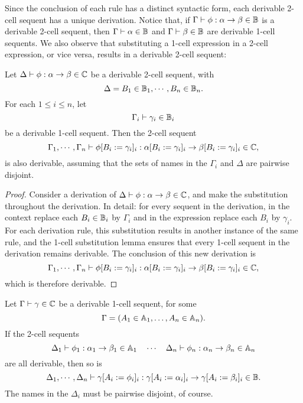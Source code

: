 \documentclass{robinthesisdraft}
\begin{document}
Since the conclusion of each rule has a distinct syntactic form, each derivable
2-cell sequent has a unique derivation.
Notice that, if $\Gamma\vdash \phi:\alpha\to\beta\in\mathbb{B}$ is a derivable
2-cell sequent, then $\Gamma\vdash\alpha\in\mathbb{B}$ and $\Gamma\vdash\beta\in\mathbb{B}$
are derivable 1-cell sequents.
%
We also observe that substituting a 1-cell expression in a 2-cell expression,
or vice versa, results in a derivable 2-cell sequent:
\begin{lemma}[1-in-2 substitution]\label{lemma-1in2}
	Let \( \Delta \vdash \phi:\alpha\to\beta \in\mathbb{C} \)
	be a derivable 2-cell sequent, with
	\[
		\Delta = B_{1}\in\mathbb{B}_{1}, \cdots, B_{n}\in\mathbb{B}_{n}.
	\]
	For each $1\leq i\leq n$, let
	\[
		\Gamma_{i} \vdash \gamma_{i}\in\mathbb{B}_{i}
	\]
	be a derivable 1-cell sequent. Then the 2-cell sequent
	\[ \Gamma_{1}, \cdots, \Gamma_{n}
		\vdash \phi[B_{i}:=\gamma_{i}]_{i}
		: \alpha[B_{i}:=\gamma_{i}]_{i}\to\beta[B_{i}:=\gamma_{i}]_{i}
		\in \mathbb{C}, \]
	is also derivable,
	assuming that the sets of names in the $\Gamma_{i}$ and $\Delta$
	are pairwise disjoint.
\end{lemma}
\begin{proof}
	Consider a derivation of \( \Delta \vdash \phi:\alpha\to\beta \in\mathbb{C} \),
	and make the substitution throughout the derivation. In detail: for
	every sequent in the derivation, in the context replace each $B_{i}\in\mathbb{B}_{i}$
	by $\Gamma_{i}$ and in the expression replace each $B_{i}$ by $\gamma_{i}$.
	For each derivation rule, this
	substitution results in another instance of the same rule, and the
	1-cell substitution lemma ensures that every 1-cell sequent in the
	derivation remains derivable. The conclusion of this new derivation
	is
	\[ \Gamma_{1}, \cdots, \Gamma_{n}
		\vdash \phi[B_{i}:=\gamma_{i}]_{i}
		: \alpha[B_{i}:=\gamma_{i}]_{i}\to\beta[B_{i}:=\gamma_{i}]_{i}
		\in \mathbb{C}, \]
	which is therefore derivable.
\end{proof}
\begin{lemma}[2-in-1 substitution]\label{lemma-2in1}
	Let $\Gamma\vdash\gamma\in\mathbb{C}$ be a derivable 1-cell sequent, for
	some \[ \Gamma = (A_{1}\in\mathbb{A}_{1},\dots, A_{n}\in\mathbb{A}_{n}). \]
	If the 2-cell sequents
	\[
	\Delta_{1}\vdash \phi_{1} : \alpha_{1}\to\beta_{1} \in \mathbb{A}_{1}
	\quad \cdots \quad
	\Delta_{n}\vdash \phi_{n} : \alpha_{n}\to\beta_{n} \in \mathbb{A}_{n}
	\]
	are all derivable, then so is
	\[
	\Delta_{1},\cdots,\Delta_{n}\vdash \gamma[A_{i} := \phi_{i}]_{i}
		: \gamma[A_{i} := \alpha_{i}]_{i} \to \gamma[A_{i} := \beta_{i}]_{i}
		\in\mathbb{B}.
	\]
	The names in the $\Delta_{i}$ must be pairwise disjoint, of course.
\end{lemma}
\end{document}
